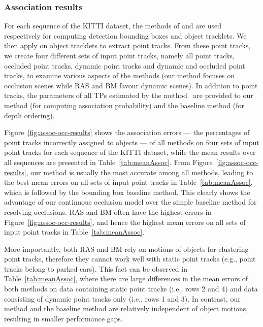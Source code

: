\subsubsection{Association results}

For each sequence of the KITTI dataset, the methods of \cite{Felzenszwalb_etal_2010} and \cite{Choi_Savarese_2010} are used respectively for computing detection bounding boxes and object tracklets. We then apply \cite{Zach2007} on object tracklets to extract point tracks. From these point tracks, we create four different sets of input point tracks, namely all point tracks, occluded point tracks, dynamic point tracks and dynamic and occluded point tracks, to examine various aspects of the methods (our method focuses on occlusion scenes while RAS and BM favour dynamic scenes). In addition to point tracks, the parameters of all TPs estimated by the method~\cite{Song_Chandraker_2014} are provided to our method (for computing association probability) and the baseline method (for depth ordering).

Figure~\ref{fig:assoc-occ-results} shows the association errors --- the percentages of point tracks incorrectly assigned to objects --- of all methods on four sets of input point tracks for each sequence of the KITTI dataset, while the mean results over all sequences are presented in Table~\ref{tab:meanAssoc}. From Figure~\ref{fig:assoc-occ-results}, our method is usually the most accurate among all methods, leading to the best mean errors on all sets of input point tracks in Table~\ref{tab:meanAssoc}, which is followed by the bounding box baseline method. This clearly shows the advantage of our continuous occlusion model over the simple baseline method for resolving occlusions. RAS and BM often have the highest errors in Figure~\ref{fig:assoc-occ-results}, and hence the highest mean errors on all sets of input point tracks in Table~\ref{tab:meanAssoc}. 

More importantly, both RAS and BM rely on motions of objects for clustering point tracks, therefore they cannot work well with static point tracks (e.g., point tracks belong to parked cars). This fact can be observed in Table~\ref{tab:meanAssoc}, where there are large differences in the mean errors of both methods on data containing static point tracks (i.e., rows 2 and 4) and data consisting of dynamic point tracks only (i.e., rows 1 and 3). In contrast, our method and the baseline method are relatively independent of object motions, resulting in smaller performance gaps.


